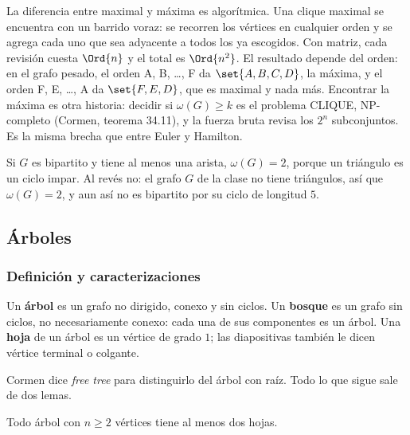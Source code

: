 \documentclass[11pt,letterpaper]{article}
\begin{document}
La diferencia entre maximal y máxima es algorítmica. Una clique
maximal se encuentra con un barrido voraz: se recorren los vértices
en cualquier orden y se agrega cada uno que sea adyacente a todos los
ya escogidos. Con matriz, cada revisión cuesta $\Ord{n}$ y el total
es $\Ord{n^2}$. El resultado depende del orden: en el grafo pesado,
el orden A, B, \dots, F da $\set{A, B, C, D}$, la máxima, y el orden
F, E, \dots, A da $\set{F, E, D}$, que es maximal y nada más. Encontrar
la máxima es otra historia: decidir si $\omega(G) \ge k$ es el
problema CLIQUE, NP-completo (Cormen, teorema 34.11), y la fuerza
bruta revisa los $2^n$ subconjuntos. Es la misma brecha que entre
Euler y Hamilton.

\begin{observacion}
  Si $G$ es bipartito y tiene al menos una arista, $\omega(G) = 2$,
  porque un triángulo es un ciclo impar. Al revés no: el grafo $G$ de
  la clase no tiene triángulos, así que $\omega(G) = 2$, y aun así no
  es bipartito por su ciclo de longitud $5$.
\end{observacion}


\subsection*{Árboles}

\subsubsection*{Definición y caracterizaciones}

\begin{definicion}
  \label{def:arbol}
  Un \textbf{árbol} es un grafo no dirigido, conexo y sin ciclos. Un
  \textbf{bosque} es un grafo sin ciclos, no necesariamente conexo:
  cada una de sus componentes es un árbol. Una \textbf{hoja} de un
  árbol es un vértice de grado $1$; las diapositivas también le dicen
  vértice terminal o colgante.
\end{definicion}

Cormen dice \textit{free tree} para distinguirlo del árbol con raíz.
Todo lo que sigue sale de dos lemas.

\begin{lema}[Hojas]
  \label{lem:arbol-hojas}
  Todo árbol con $n \ge 2$ vértices tiene al menos dos hojas.
\end{lema}
\end{document}
